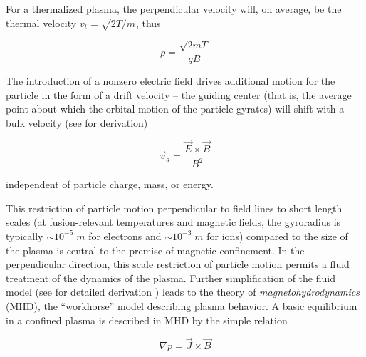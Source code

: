 \noindent For a thermalized plasma, the perpendicular velocity will, on average, be the thermal velocity $v_t = \sqrt{2T/m}$, thus

\begin{equation}\label{eq:gyroradius2}
 \rho = \frac{\sqrt{2mT}}{qB}
\end{equation}

\noindent The introduction of a nonzero electric field drives additional motion for the particle in the form of a drift velocity -- the guiding center (that is, the average point about which the orbital motion of the particle gyrates) will shift with a bulk velocity (see  for derivation)

\begin{equation}\label{eq:exb}
 \vec{v}_d = \frac{\vec{E} \times \vec{B}}{B^2}
\end{equation}

\noindent independent of particle charge, mass, or energy.

This restriction of particle motion perpendicular to field lines to short length scales (at fusion-relevant temperatures and magnetic fields, the gyroradius is typically $\sim 10^{-5} \;\si{m}$ for electrons and $\sim 10^{-3} \;\si{m}$ for ions) compared to the size of the plasma is central to the premise of magnetic confinement.  In the perpendicular direction, this scale restriction of particle motion permits a fluid treatment of the dynamics of the plasma.  Further simplification of the fluid model (see \cite{Freidberg1987} for detailed derivation ) leads to the theory of \emph{magnetohydrodynamics} (MHD), the ``workhorse'' model describing plasma behavior.  A basic equilibrium in a confined plasma is described in MHD by the simple relation

\begin{equation}\label{eq:MHDeq}
 \nabla p = \vec{J} \times \vec{B}
\end{equation}

